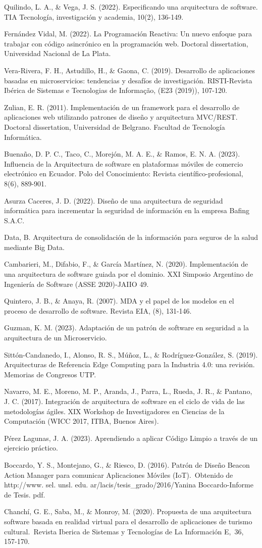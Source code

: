 \documentclass[12pt]{article}
\begin{document}
Quilindo, L. A., & Vega, J. S. (2022). Especificando una arquitectura de software. TIA Tecnología, investigación y academia, 10(2), 136-149.

Fernández Vidal, M. (2022). La Programación Reactiva: Un nuevo enfoque para trabajar con código asincrónico en la programación web. Doctoral dissertation, Universidad Nacional de La Plata.

Vera-Rivera, F. H., Astudillo, H., & Gaona, C. (2019). Desarrollo de aplicaciones basadas en microservicios: tendencias y desafíos de investigación. RISTI-Revista Ibérica de Sistemas e Tecnologias de Informação, (E23 (2019)), 107-120.

Zulian, E. R. (2011). Implementación de un framework para el desarrollo de aplicaciones web utilizando patrones de diseño y arquitectura MVC/REST. Doctoral dissertation, Universidad de Belgrano. Facultad de Tecnología Informática.

Buenaño, D. P. C., Taco, C., Morejón, M. A. E., & Ramos, E. N. A. (2023). Influencia de la Arquitectura de software en plataformas móviles de comercio electrónico en Ecuador. Polo del Conocimiento: Revista científico-profesional, 8(6), 889-901.

Asurza Caceres, J. D. (2022). Diseño de una arquitectura de seguridad informática para incrementar la seguridad de información en la empresa Bafing S.A.C.

Data, B. Arquitectura de consolidación de la información para seguros de la salud mediante Big Data.

Cambarieri, M., Difabio, F., & García Martínez, N. (2020). Implementación de una arquitectura de software guiada por el dominio. XXI Simposio Argentino de Ingeniería de Software (ASSE 2020)-JAIIO 49.

Quintero, J. B., & Anaya, R. (2007). MDA y el papel de los modelos en el proceso de desarrollo de software. Revista EIA, (8), 131-146.

Guzman, K. M. (2023). Adaptación de un patrón de software en seguridad a la arquitectura de un Microservicio.

Sittón-Candanedo, I., Alonso, R. S., Múñoz, L., & Rodríguez-González, S. (2019). Arquitecturas de Referencia Edge Computing para la Industria 4.0: una revisión. Memorias de Congresos UTP.

Navarro, M. E., Moreno, M. P., Aranda, J., Parra, L., Rueda, J. R., & Pantano, J. C. (2017). Integración de arquitectura de software en el ciclo de vida de las metodologías ágiles. XIX Workshop de Investigadores en Ciencias de la Computación (WICC 2017, ITBA, Buenos Aires).

Pérez Lagunas, J. A. (2023). Aprendiendo a aplicar Código Limpio a través de un ejercicio práctico.

Boccardo, Y. S., Montejano, G., & Riesco, D. (2016). Patrón de Diseño Beacon Action Manager para comunicar Aplicaciones Móviles (IoT). Obtenido de http://www. sel. unsl. edu. ar/lacis/tesis_grado/2016/Yanina Boccardo-Informe de Tesis. pdf.

Chanchí, G. E., Saba, M., & Monroy, M. (2020). Propuesta de una arquitectura software basada en realidad virtual para el desarrollo de aplicaciones de turismo cultural. Revista Iberica de Sistemas y Tecnologías de La Información E, 36, 157-170.
\end{document}
